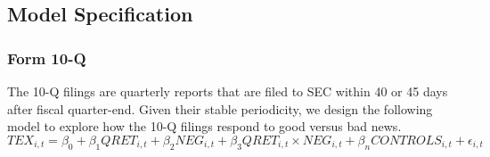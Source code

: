 \documentclass[a4paper]{article}
\begin{document}
\begin{spacing}{2}
\subsection{Model Specification}
\subsubsection{Form 10-Q}
The 10-Q filings are quarterly reports that are filed to SEC within 40 or 45 days after fiscal quarter-end. Given their stable periodicity, we design the following model to explore how the 10-Q filings respond to good versus bad news. 
\begin{equation} \label{eq1}
TEX_{i,t}=\beta_0+\beta_1QRET_{i,t}+\beta_2NEG_{i,t}+\beta_3QRET_{i,t}\times NEG_{i,t}+\beta_nCONTROLS_{i,t}+\epsilon_{i,t}
\end{equation}


\end{spacing}
\end{document}
